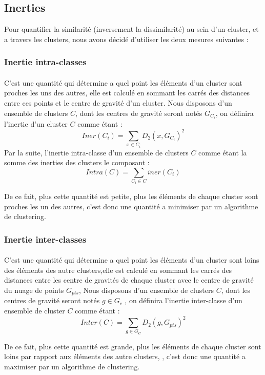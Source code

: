 	\subsection{Inerties}
		 Pour quantifier la similarité (inversement la dissimilarité) au sein d'un cluster, et a travers les clusters, nous avons décidé d'utiliser les deux mesures suivantes : 
		 
		 \subsubsection{Inertie intra-classes}
		 	\paragraph{}\label{inertie}
		 	C'est une quantité qui détermine a quel point les éléments d'un cluster sont proches les uns des autres, elle est calculé en sommant les carrés des distances entre ces points et le centre de gravité d'un cluster. Nous disposons d'un ensemble de clusters $C$, dont les centres de gravité seront notés $G_{C_i}$, on définira l'inertie d'un cluster $C$ comme étant : 
		 	\[
		 		Iner(C_i) = \sum_{x \in C_i } D_2(x,G_{C_i})^2
		 	\]
		 	Par la suite, l'inertie intra-classe d'un ensemble de clusters $C$  comme étant la somme des inerties des clusters le composant : 
		 	\[
		 		Intra(C) = \sum_{C_i \in C} iner(C_i) 
		 	\]
		 	\par De ce fait, plus cette quantité est petite, plus les éléments de chaque cluster sont proches les un des autres, c'est donc une quantité a minimiser par un algorithme de clustering.
		 	
		 \subsubsection{Inertie inter-classes}
			 \paragraph{}
			 C'est une quantité qui détermine a quel point les éléments d'un cluster sont loins des éléments des autre clusters,elle est calculé en sommant les carrés des distances entre les centre de gravités de chaque cluster avec le centre de gravité du nuage de points $G_{pts}$, Nous disposons d'un ensemble de clusters $C$, dont les centres de gravité seront notés $g \in G_c$ , on définira l'inertie inter-classe d'un ensemble de cluster $C$ comme étant : 
			 \[
			 Inter(C) = \sum_{g \in G_C } D_2(g,G_{pts})^2
			 \]
			 \par De ce fait, plus cette quantité est grande, plus les éléments de chaque cluster sont loins par rapport aux éléments des autre clusters, , c'est donc une quantité a maximiser par un algorithme de clustering.
